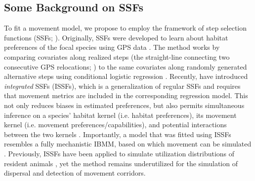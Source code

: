 \documentclass[abstract=on,10pt,a4paper,bibliography=totocnumbered]{article}
\begin{document}
\subsection{Some Background on SSFs}
To fit a movement model, we propose to employ the framework of step selection
functions (SSFs; \citealp{Fortin.2005, Thurfjell.2014, Avgar.2016}). Originally,
SSFs were developed to learn about habitat preferences of the focal species
using GPS data \citep{Fortin.2005}. The method works by comparing covariates
along realized steps (the straight-line connecting two consecutive GPS
relocations; \citealp{Turchin.1998}) to the same covariates along randomly
generated alternative steps \citep{Fortin.2005, Thurfjell.2014} using
conditional logistic regression \citep{Fortin.2005, Muff.2020}. Recently,
\cite{Avgar.2016} have introduced \textit{integrated} SSFs (ISSFs), which is a
generalization of regular SSFs and requires that movement metrics are included
in the corresponding regression model. This not only reduces biases in estimated
preferences, but also permits simultaneous inference on a species' habitat
kernel (i.e. habitat preferences), its movement kernel (i.e. movement
preferences/capabilities), and potential interactions between the two kernels
\citep{Avgar.2016, Fieberg.2020}. Importantly, a model that was fitted using
ISSFs resembles a fully mechanistic IBMM, based on which movement can be
simulated \citep{Avgar.2016, Signer.2017}. Previously, ISSFs have been applied
to simulate utilization distributions of resident animals \citep{Avgar.2016,
Signer.2017}, yet the method remains underutilized for the simulation of
dispersal and detection of movement corridors.

\end{document}

